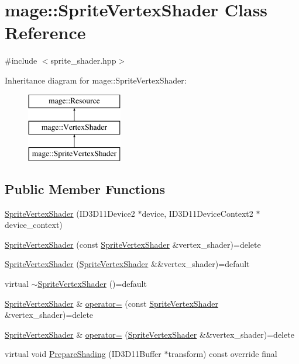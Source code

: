 \hypertarget{classmage_1_1_sprite_vertex_shader}{}\section{mage\+:\+:Sprite\+Vertex\+Shader Class Reference}
\label{classmage_1_1_sprite_vertex_shader}


{\ttfamily \#include $<$sprite\+\_\+shader.\+hpp$>$}

Inheritance diagram for mage\+:\+:Sprite\+Vertex\+Shader\+:\begin{figure}[H]
\begin{center}
\leavevmode
\includegraphics[height=3.000000cm]{classmage_1_1_sprite_vertex_shader}
\end{center}
\end{figure}
\subsection*{Public Member Functions}
\begin{DoxyCompactItemize}
\item 
\hyperlink{classmage_1_1_sprite_vertex_shader_a57f08ac16ace6190281fb4fa413c1b9e}{Sprite\+Vertex\+Shader} (I\+D3\+D11\+Device2 $\ast$device, I\+D3\+D11\+Device\+Context2 $\ast$device\+\_\+context)
\item 
\hyperlink{classmage_1_1_sprite_vertex_shader_a00f902a89cc3f9c9ce3d5b526eece29c}{Sprite\+Vertex\+Shader} (const \hyperlink{classmage_1_1_sprite_vertex_shader}{Sprite\+Vertex\+Shader} \&vertex\+\_\+shader)=delete
\item 
\hyperlink{classmage_1_1_sprite_vertex_shader_afb8c1866f6ffdb0fdcd1017591b8c832}{Sprite\+Vertex\+Shader} (\hyperlink{classmage_1_1_sprite_vertex_shader}{Sprite\+Vertex\+Shader} \&\&vertex\+\_\+shader)=default
\item 
virtual \hyperlink{classmage_1_1_sprite_vertex_shader_a8bed9663e8aac773ed31c58ca6e0d98f}{$\sim$\+Sprite\+Vertex\+Shader} ()=default
\item 
\hyperlink{classmage_1_1_sprite_vertex_shader}{Sprite\+Vertex\+Shader} \& \hyperlink{classmage_1_1_sprite_vertex_shader_a4400ddda9637b280b7c8aedeeec6e4e7}{operator=} (const \hyperlink{classmage_1_1_sprite_vertex_shader}{Sprite\+Vertex\+Shader} \&vertex\+\_\+shader)=delete
\item 
\hyperlink{classmage_1_1_sprite_vertex_shader}{Sprite\+Vertex\+Shader} \& \hyperlink{classmage_1_1_sprite_vertex_shader_aac64cf5df2b118ba95be72aef2bd3dca}{operator=} (\hyperlink{classmage_1_1_sprite_vertex_shader}{Sprite\+Vertex\+Shader} \&\&vertex\+\_\+shader)=delete
\item 
virtual void \hyperlink{classmage_1_1_sprite_vertex_shader_a10be47ca65f4baed735b5ffb52ee92bf}{Prepare\+Shading} (I\+D3\+D11\+Buffer $\ast$transform) const override final
\end{DoxyCompactItemize}
